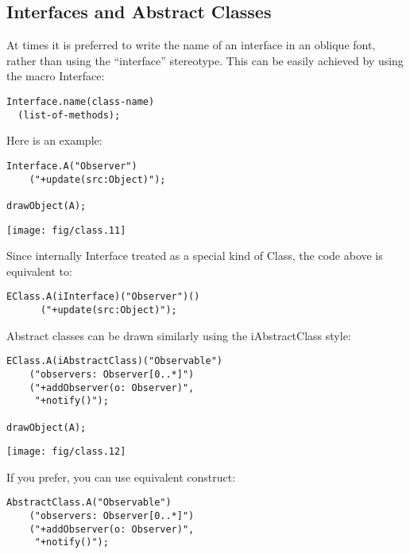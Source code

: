 \documentclass{article}
\newcommand{\code}{\ttfamily}
\begin{document}
\subsection{Interfaces and Abstract Classes}

At times it is preferred to write the name of an interface in an oblique font, rather than using the ``interface''
stereotype. This can be easily achieved by using the macro {\code Interface}:

\begin{verbatim}
Interface.name(class-name)
  (list-of-methods);
\end{verbatim}

Here is an example:

\begin{multicols}{2}
\begin{verbatim}
Interface.A("Observer")
    ("+update(src:Object)");

drawObject(A);
\end{verbatim}
\columnbreak
\hspace{1cm}\texttt{[image: fig/class.11]}
\end{multicols}

Since internally {\code Interface} treated as a special kind of {\code Class}, the code above is equivalent to:
\begin{verbatim}
EClass.A(iInterface)("Observer")()
      ("+update(src:Object)");
\end{verbatim}

Abstract classes can be drawn similarly using the {\code iAbstractClass} style:
\begin{samepage}
\begin{multicols}{2}
\begin{verbatim}
EClass.A(iAbstractClass)("Observable")
    ("observers: Observer[0..*]")
    ("+addObserver(o: Observer)",
     "+notify()");

drawObject(A);
\end{verbatim}
\columnbreak
\hspace{1cm}\texttt{[image: fig/class.12]}
\end{multicols}
\end{samepage}

If you prefer, you can use equivalent construct:

\begin{verbatim}
AbstractClass.A("Observable")
    ("observers: Observer[0..*]")
    ("+addObserver(o: Observer)",
     "+notify()");
\end{verbatim}
\end{document}

